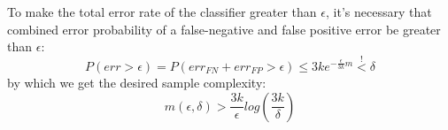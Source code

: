 To make the total error rate of the classifier greater than $\epsilon$, it's necessary that combined error probability of a false-negative and false positive error be greater than $\epsilon$:
\begin{equation*}
    P(err > \epsilon) = P(err_{FN} + err_{FP} > \epsilon) \leq 3ke^{-\frac{\epsilon}{3k}m} \overset{!}{<} \delta
\end{equation*}
by which we get the desired sample complexity:
\begin{equation*}
    m(\epsilon, \delta) > \frac{3k}{\epsilon} log(\frac{3k}{\delta})
\end{equation*}
